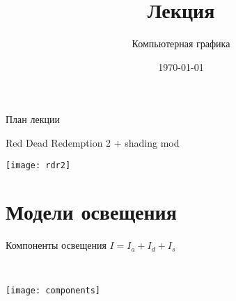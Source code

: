 \documentclass[10pt]{beamer}
\date{\today}
\title{Лекция \lecdni \\ \LectionTheme}
\subtitle{Компьютерная графика}
\begin{document}
 		 


\newcommand \abs[1] {\left| #1 \right|}

\everymath{\displaystyle}

    
    \QRFRAME	
	

	\frame{\maketitle}

	
	\begin{frame}{План лекции}
		\tableofcontents
	\end{frame}
	

	
	\begin{frame}{Red Dead Redemption 2 + shading mod}
		
		\centering\texttt{[image: rdr2]}
		
	\end{frame}	
	
	
	\begin{comment}
		
	
	\begin{frame}{Обозначения}
		\TC{0.5}
		{
			\texttt{[image: light.pdf]}
			
		}
		{
			$\vv l$ --- направление на источник света
			
			~
			
			$\vv v$ --- направление на наблюдателя (камеру)
			
			~
			
			$\vv n$ --- вектор нормали
			
			~
			
			$\vv r$ --- $v$ отражённый от $\vv n$, $\vv r = 2\vv n (\vv n \cdot \vv v) - \vv v$
			
			~
			
			$\vv h$ --- биссектор векторов $\vv v$ и $\vv l$, $\vv h =\dfrac{\VV v + \VV l}{\ABS{\VV v+ \VV l}}$
			
		}
	
			
	\end{frame}	
	
	\end{comment}
	
	\section{Модели освещения}
	
	\begin{frame}{Компоненты освещения}
		\centering
		$I=I_a+I_d+I_s$
		
		~
		
		\texttt{[image: components]}
	\end{frame}
	
\end{document}
